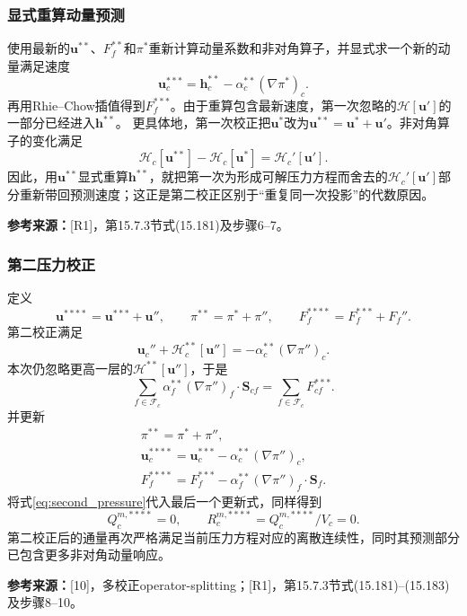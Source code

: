 \documentclass[UTF8,12pt,a4paper]{ctexart}
\numberwithin{equation}{section}
\newcommand{\Issa}{\textnormal{[10]}}
\newcommand{\Rone}{\textnormal{[R1]}}
\newcommand{\source}[1]{\par\smallskip\noindent\colorbox{sourcebg}{%
  \parbox{0.955\linewidth}{\footnotesize\color{sourcegray}\textbf{参考来源：}#1}}\par\smallskip}
\begin{document}
\subsubsection{显式重算动量预测}
使用最新的$\bm u^{**}$、$F_f^{**}$和$\pi^*$重新计算动量系数和非对角算子，并显式求一个新的动量满足速度
\begin{equation}
  \boxed{\bm u_c^{***}
  =\bm h_c^{**}-\alpha_c^{**}(\nabla\pi^*)_c.}
  \label{eq:second_predictor}
\end{equation}
再用Rhie--Chow插值得到$F_f^{***}$。由于重算包含最新速度，第一次忽略的$\mathcal H[\bm u']$的一部分已经进入$\bm h^{**}$。
更具体地，第一次校正把$\bm u^*$改为$\bm u^{**}=\bm u^*+\bm u'$。非对角算子的变化满足
\begin{equation}
  \mathcal H_c[\bm u^{**}]-\mathcal H_c[\bm u^*]
  =\mathcal H_c'[\bm u'].
\end{equation}
因此，用$\bm u^{**}$显式重算$\bm h^{**}$，就把第一次为形成可解压力方程而舍去的$\mathcal H_c'[\bm u']$部分重新带回预测速度；这正是第二校正区别于“重复同一次投影”的代数原因。
\source{\Rone，第15.7.3节式(15.181)及步骤6--7。}

\subsubsection{第二压力校正}
定义
\begin{equation}
  \bm u^{****}=\bm u^{***}+\bm u'',\qquad
  \pi^{**}=\pi^*+\pi'',\qquad
  F_f^{****}=F_f^{***}+F_f''.
\end{equation}
第二校正满足
\begin{equation}
  \bm u_c''+\mathcal H_c^{**}[\bm u'']
  =-\alpha_c^{**}(\nabla\pi'')_c.
  \label{eq:second_exact}
\end{equation}
本次仍忽略更高一层的$\mathcal H^{**}[\bm u'']$，于是
\begin{equation}
  \boxed{\sum_{f\in\mathcal F_c}
  \alpha_f^{**}(\nabla\pi'')_f\cdot\bm S_{cf}
  =\sum_{f\in\mathcal F_c}F_{cf}^{***}.}
  \label{eq:second_pressure}
\end{equation}
并更新
\begin{align}
  \boxed{\pi^{**}=\pi^*+\pi'',}\\
  \boxed{\bm u_c^{****}
  =\bm u_c^{***}-\alpha_c^{**}(\nabla\pi'')_c,}\\
  \boxed{F_f^{****}
  =F_f^{***}-\alpha_f^{**}(\nabla\pi'')_f\cdot\bm S_f.}
  \label{eq:second_updates}
\end{align}
将式\eqref{eq:second_pressure}代入最后一个更新式，同样得到
\begin{equation}
  \boxed{Q_c^{m,****}=0,
  \qquad R_c^{m,****}=Q_c^{m,****}/V_c=0.}
\end{equation}
第二校正后的通量再次严格满足当前压力方程对应的离散连续性，同时其预测部分已包含更多非对角动量响应。
\source{\Issa，多校正operator-splitting；\Rone，第15.7.3节式(15.181)--(15.183)及步骤8--10。}
\end{document}
